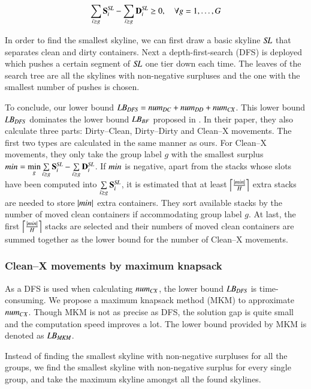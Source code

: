 \documentclass[review,3p,times,authoryear,12pt]{elsarticle}
\begin{document}
\begin{equation}
\label{equ:3}
\sum\limits_{i\ge g}\mathbf S^\id{SL}_i-\sum\limits_{i\ge g}\mathbf D^\id{SL}_i\ge0, \quad \forall g=1,\dots,G
\end{equation}

In order to find the smallest skyline, we can first draw a basic skyline $\id{SL}$ that separates clean and dirty containers. Next a depth-first-search (DFS) is deployed which pushes a certain segment of $\id{SL}$ one tier down each time. The leaves of the search tree are all the skylines with non-negative surpluses and the one with the smallest number of pushes is chosen.

To conclude, our lower bound $\id{LB}_\id{DFS}=\id{num}_\id{DC}+\id{num}_\id{DD}+\id{num}_\id{CX}$. This lower bound $\id{LB}_\id{DFS}$ dominates the lower bound $\id{LB}_\id{BF}$ proposed in \cite{BF2012}. In their paper, they also calculate three parts: Dirty--Clean, Dirty--Dirty and Clean--X movements.
The first two types are calculated in the same manner as ours. For Clean--X movements, they only take the group label $g$ with the smallest surplus $\id{min}=\min\limits_g\sum\limits_{i\ge g}\mathbf S^\id{SL}_i-\sum\limits_{i\ge g}\mathbf D^\id{SL}_i$.
If $\id{min}$ is negative, apart from the stacks whose slots have been computed into $\sum\limits_{i\ge g}\mathbf S^\id{SL}_i$, it is estimated that at least $\left\lceil\frac{|\id{min}|}{H}\right\rceil$ extra stacks are needed to store $|\id{min}|$ extra containers. They sort available stacks by the number of moved clean containers if accommodating group label $g$. At last, the first $\left\lceil\frac{|\id{min}|}{H}\right\rceil$ stacks are selected and their numbers of moved clean containers are summed together as the lower bound for the number of Clean--X movements.

\subsubsection{Clean--X movements by maximum knapsack}

As a DFS is used when calculating $\id{num}_{\id{CX}}$, the lower bound $\id{LB}_\id{DFS}$ is time-consuming. We propose a maximum knapsack method (MKM) to approximate $\id{num}_{CX}$. Though MKM is not as precise as DFS, the solution gap is quite small and the computation speed improves a lot. The lower bound provided by MKM is denoted as $\id{LB}_{\id{MKM}}$.

Instead of finding the smallest skyline with non-negative surpluses for all the groups, we find the smallest skyline with non-negative surplus for every single group, and take the maximum skyline amongst all the found skylines.
\end{document}
